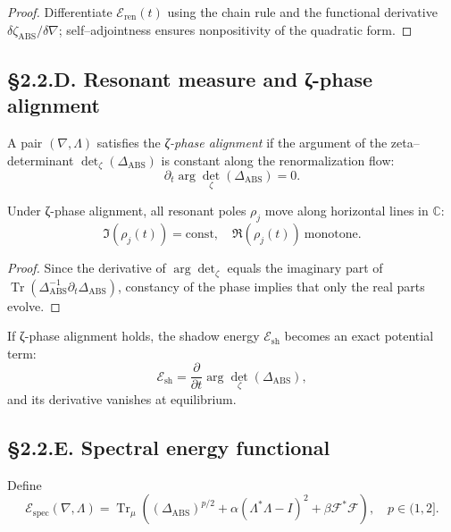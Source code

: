 \begin{proof}
Differentiate $\mathcal{E}_{\mathrm{ren}}(t)$ using the chain rule and the functional derivative $\delta \zeta_{\mathrm{ABS}}/\delta \nabla$; self–adjointness ensures nonpositivity of the quadratic form.
\end{proof}

\subsection*{§2.2.D. Resonant measure and ζ-phase alignment}

\begin{definition}
A pair $(\nabla,\Lambda)$ satisfies the \emph{ζ-phase alignment} if 
the argument of the zeta–determinant $\det_\zeta(\Delta_{\mathrm{ABS}})$ is constant along the renormalization flow:
\[
\partial_t \arg\det_\zeta(\Delta_{\mathrm{ABS}})=0.
\]
\end{definition}

\begin{theorem}\label{thm:2.2.zetaalign}
Under ζ-phase alignment, all resonant poles $\rho_j$ move along horizontal lines in $\mathbb{C}$:
\[
\Im(\rho_j(t))=\mathrm{const},\quad \Re(\rho_j(t))\ \text{monotone}.
\]
\end{theorem}

\begin{proof}
Since the derivative of $\arg\det_\zeta$ equals the imaginary part of $\operatorname{Tr}(\Delta_{\mathrm{ABS}}^{-1}\partial_t\Delta_{\mathrm{ABS}})$, constancy of the phase implies that only the real parts evolve.
\end{proof}

\begin{corollary}
If ζ-phase alignment holds, the shadow energy $\mathcal{E}_{\mathrm{sh}}$ becomes an exact potential term:
\[
\mathcal{E}_{\mathrm{sh}} = \frac{\partial}{\partial t}\arg\det_\zeta(\Delta_{\mathrm{ABS}}),
\]
and its derivative vanishes at equilibrium.
\end{corollary}

\subsection*{§2.2.E. Spectral energy functional}

\begin{definition}
Define
\[
\mathcal{E}_{\mathrm{spec}}(\nabla,\Lambda)
=\operatorname{Tr}_\mu\!\left(
 (\Delta_{\mathrm{ABS}})^{p/2}
 +\alpha(\Lambda^\ast\Lambda-I)^2
 +\beta \mathcal{F}^\ast\mathcal{F}
 \right),
\quad p\in(1,2].
\]
\end{definition}


